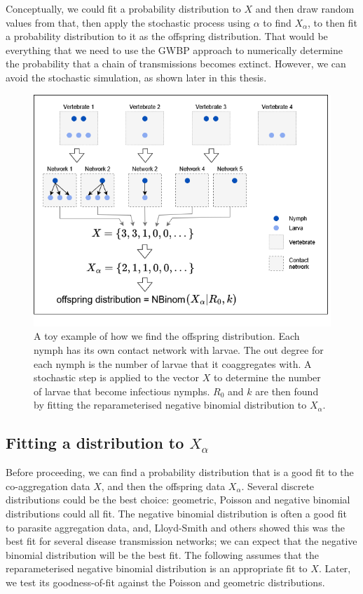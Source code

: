 \documentclass{article}
\begin{document}
Conceptually, we could fit a probability distribution to $ X $ and then draw random values from that, then apply the stochastic process using $ \alpha $ to find $ X_\alpha $, to then fit a probability  distribution to it as the offspring distribution. That would be everything that we need to use the GWBP approach to numerically determine the probability that a chain of transmissions becomes extinct. However, we can avoid the stochastic simulation, as shown  later in this thesis.

\begin{figure}[h!]
    \includegraphics[width=1\textwidth, center]{Images/coaggregation_data_diagram_mk3.drawio.png}
    \caption{A toy example of how we find the offspring distribution. Each nymph has its own contact network with larvae. The out degree for each nymph is the number of larvae that it coaggregates with. A stochastic step is applied to the vector $ X $ to determine the number of larvae that become infectious nymphs. $ R_0 $ and $ k $ are then found by fitting the reparameterised negative binomial distribution to $ X_\alpha $.}\label{fig:coaggregation_diagram}
\end{figure}

\subsection{Fitting a distribution to \texorpdfstring{$ X_\alpha $}{X_alpha}}

Before proceeding, we can find a probability distribution that is a good fit to the co-aggregation data $ X $, and then the offspring data $ X_\alpha $. Several discrete distributions could be the best choice: geometric, Poisson and negative binomial distributions could all fit. The negative binomial distribution is often a good fit to parasite aggregation data, and, Lloyd-Smith and others showed this was the best fit for several disease transmission networks; we can expect that the negative binomial distribution will be the best fit. The following assumes that the reparameterised negative binomial distribution is an appropriate fit to $ X $. Later, we test its goodness-of-fit against the Poisson and geometric distributions.
\end{document}
